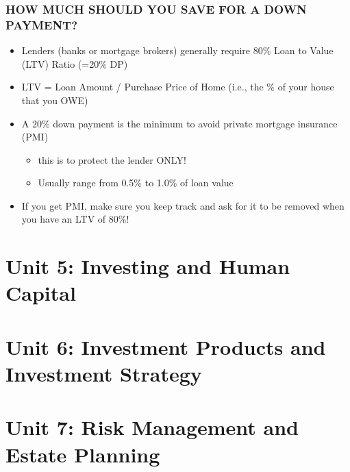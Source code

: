 \documentclass[12pt]{article}
\begin{document}
            \subsubsection{HOW MUCH SHOULD YOU SAVE FOR A DOWN PAYMENT?}
                \begin{itemize}
                    \item Lenders (banks or mortgage brokers) generally require 80\% Loan to Value (LTV) Ratio (=20\% DP)
                    \item LTV = Loan Amount / Purchase Price of Home (i.e., the \% of your house that you OWE)
                    \item A 20\% down payment is the minimum to avoid private mortgage insurance (PMI)
                        \begin{itemize}
                            \item this is to protect the lender ONLY!
                            \item Usually range from 0.5\% to 1.0\% of loan value
                        \end{itemize}
                    \item If you get PMI, make sure you keep track and ask for it to be removed when you have an LTV of 80\%!
                \end{itemize}

    \section{Unit 5: Investing and Human Capital}
    
    \section{Unit 6: Investment Products and Investment Strategy}

    \section{Unit 7: Risk Management and Estate Planning}
    
\end{document}
